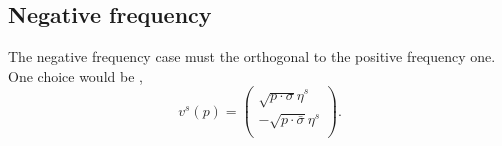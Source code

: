 \documentclass[11pt, english, fleqn, DIV=15, headinclude, BCOR=1cm]{scrartcl}
\begin{document}
\subsection{Negative frequency}

The negative frequency case must the orthogonal to the positive frequency one.
One choice would be \parencite[(3.62)]{Peskin/QFT/1995},
\[
    v^s(p) =
    \begin{pmatrix}
        \sqrt{p \cdot \sigma} \eta^s \\
        - \sqrt{p \cdot \bar\sigma} \eta^s \\
    \end{pmatrix}.
\]
\end{document}
